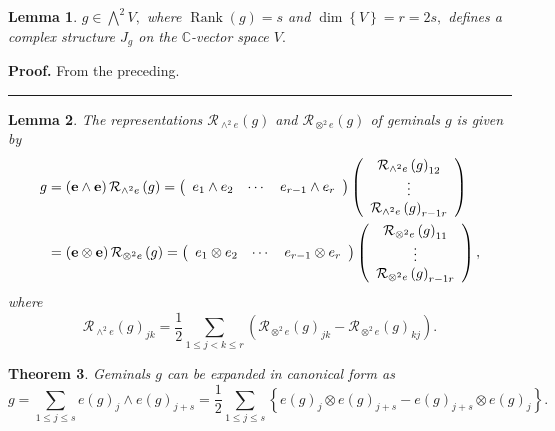 \documentclass[aps,preprint]{revtex4}%
\newtheorem{theorem}{Theorem}
\newtheorem{lemma}[theorem]{Lemma}
\newenvironment{proof}[1][Proof]{\noindent\textbf{#1.} }{\ \rule{0.5em}{0.5em}}
\begin{document}
\begin{lemma}
$g\in\bigwedge\nolimits^{2}V,$ where $\operatorname*{Rank}\left(  g\right)
=s$ and $\dim\left\{  V\right\}  =r=2s,$ defines a complex structure $J_{g}$
on the $\mathbb{C}$-vector space $V.$
\end{lemma}

\begin{proof}
From the preceding.
\end{proof}

\begin{lemma}
The representations $\mathcal{R}_{\wedge^{2}e}\left(  g\right)  $ and
$\mathcal{R}_{\otimes^{2}e}\left(  g\right)  $ of geminals $g$ is given by
\begin{align}
g  &  =\left(  \mathbf{e}\wedge\mathbf{e}\right)  \mathcal{R}_{\wedge^{2}%
e}\left(  g\right)  =\left(
\begin{array}
[c]{ccc}%
e_{1}\wedge e_{2} & \cdots & e_{r-1}\wedge e_{r}%
\end{array}
\right)  \left(
\begin{array}
[c]{c}%
\mathcal{R}_{\wedge^{2}e}\left(  g\right)  _{12}\\
\vdots\\
\mathcal{R}_{\wedge^{2}e}\left(  g\right)  _{r-1r}%
\end{array}
\right) \\
&  =\left(  \mathbf{e}\otimes\mathbf{e}\right)  \mathcal{R}_{\otimes^{2}%
e}\left(  g\right)  =\left(
\begin{array}
[c]{ccc}%
e_{1}\otimes e_{2} & \cdots & e_{r-1}\otimes e_{r}%
\end{array}
\right)  \left(
\begin{array}
[c]{c}%
\mathcal{R}_{\otimes^{2}e}\left(  g\right)  _{11}\\
\vdots\\
\mathcal{R}_{\otimes^{2}e}\left(  g\right)  _{r-1r}%
\end{array}
\right)  ,
\end{align}
where
\begin{equation}
\mathcal{R}_{\wedge^{2}e}\left(  g\right)  _{jk}=\frac{1}{2}\sum_{1\leq
j<k\leq r}\left(  \mathcal{R}_{\otimes^{2}e}\left(  g\right)  _{jk}%
-\mathcal{R}_{\otimes^{2}e}\left(  g\right)  _{kj}\right)  .
\end{equation}

\end{lemma}

\begin{theorem}
Geminals $g$ can be expanded in canonical form as
\begin{equation}
g=\sum_{1\leq j\leq s}e\left(  g\right)  _{j}\wedge e\left(  g\right)
_{j+s}=\frac{1}{2}\sum_{1\leq j\leq s}\left\{  e\left(  g\right)  _{j}\otimes
e\left(  g\right)  _{j+s}-e\left(  g\right)  _{j+s}\otimes e\left(  g\right)
_{j}\right\}  .
\end{equation}

\end{theorem}
\end{document}
